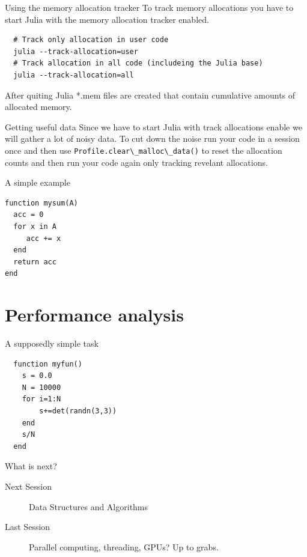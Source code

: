 \documentclass{beamer}
\begin{document}
\begin{frame}[fragile]{Using the memory allocation tracker}
  To track memory allocations you have to start Julia with the memory allocation tracker enabled.
  \begin{lstlisting}
  # Track only allocation in user code
  julia --track-allocation=user
  # Track allocation in all code (includeing the Julia base)
  julia --track-allocation=all
  \end{lstlisting}
  After quiting Julia *.mem files are created that contain cumulative amounts of allocated memory.
  \begin{block}{Getting useful data}
    Since we have to start Julia with track allocations enable we will gather a lot of noisy data.
    To cut down the noise run your code in a session once and then use \lstinline{Profile.clear\_malloc\_data()}
    to reset the allocation counts and then run your code again only tracking revelant allocations.
  \end{block}
\end{frame}
\begin{frame}[fragile]{A simple example}
\begin{lstlisting}
function mysum(A)
  acc = 0
  for x in A
     acc += x
  end
  return acc
end
\end{lstlisting}
\end{frame}
\section{Performance analysis}
\begin{frame}[fragile]{A supposedly simple task}
  \begin{lstlisting}
  function myfun()
    s = 0.0
    N = 10000
    for i=1:N
        s+=det(randn(3,3))
    end
    s/N
  end
  \end{lstlisting}
\end{frame}

\begin{frame}{What is next?}
  \begin{description}
    \item[Next Session] Data Structures and Algorithms
    \item[Last Session] Parallel computing, threading, GPUs? Up to grabs.
  \end{description}
\end{frame}
\end{document}

